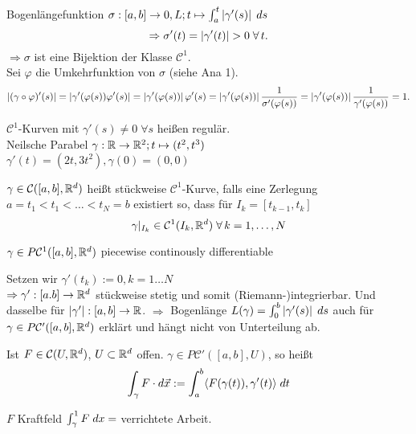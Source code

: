 \documentclass[../ana2.tex]{subfiles}
\begin{document}
\begin{bew}
    Bogenlängefunktion
    \(\abb{\sigma}{[a,b]}{0, L}; t \mapsto \integralx{\abs{\gamma'(s)}}{a}{t}{s}\)
    \[ \Rightarrow \sigma'(t) = \abs{\gamma'(t)} > 0 \;\forall t. \]
    \( \Rightarrow \sigma \) ist eine Bijektion der Klasse 
    \(\mathcal{C}^1\).\\
    Sei \(\varphi\) die Umkehrfunktion von \(\sigma\) (siehe Ana 1).
    \[\abs{(\gamma \circ \varphi)'(s)} = \abs{\gamma'(\varphi(s))\varphi'(s)} 
    = \abs{\gamma'(\varphi(s))} \varphi'(s) 
    = \abs{\gamma'(\varphi(s))} \frac{1}{\sigma'(\varphi(s))} 
    =  \abs{\gamma'(\varphi(s))} \frac{1}{\gamma'(\varphi(s))} = 1. \]
\end{bew}
\begin{bem}
    \(\mathcal{C}^1\)-Kurven mit \(\gamma'(s) \neq 0 \; \forall s\)
    heißen regulär.\\
    Neilsche Parabel 
    \( \abb{\gamma}{\R}{\R^2}; t \mapsto (t^2, t^3)\)\\
    \(\gamma'(t) = (2t, 3t^2), \gamma(0) = (0, 0)\)
\end{bem}
\begin{defi}
    \(\gamma \in \mathcal{C}([a,b], \R^d)\) heißt stückweise
    \(\mathcal{C}^1\)-Kurve, falls eine Zerlegung
    \(a = t_1 < t_1 < \ldots < t_N = b\) existiert so, dass
    für \( I_k = [t_{k-1}, t_k]\)
    \[ \gamma \vert_{I_k} \in \mathcal{C}^1(I_k, \R^d) \; \forall k = 1,\ldots,N \]
\end{defi}
\begin{notation}
    \( \gamma \in P \mathcal{C}^1([a,b], \R^d)\)
    piecewise continously differentiable
\end{notation}
Setzen wir \(\gamma'(t_k):= 0, k = 1 \ldots N\) \\
\( \Rightarrow \abb{\gamma'}{[a.b]}{\R^d} \) stückweise stetig 
und somit (Riemann-)integrierbar.
Und dasselbe für \( \abb{\abs{\gamma'} }{[a,b]}{\R} \).
\(\Rightarrow \) Bogenlänge \(L(\gamma) = \integralx{\abs{\gamma'(s)}}{0}{b}{s}\)
auch für \(\gamma \in P \mathcal{C}'([a,b], \R^d)\) erklärt
und hängt nicht von Unterteilung ab.
\begin{defi}[Linienintegral]
    Ist \( F \in \mathcal{C}(U, \R^d) \), \(U \subset \R^d\) offen. 
    \( \gamma \in P\mathcal{C}'([a,b], U) \), so heißt 
    \[ \int_\gamma F\cdot d \vec{x} 
    := \integralx{\scalarprod{ F(\gamma(t)) }{ \gamma'(t) } }{a}{b}{t} \]
\end{defi}
\(F\) Kraftfeld \(\integral{F}{\gamma}{1} = \) verrichtete Arbeit.
\end{document}
